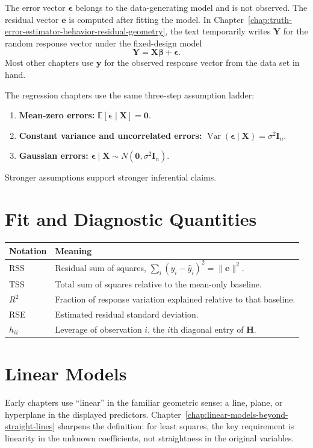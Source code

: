 {The error vector $\boldsymbol{\epsilon}$ belongs to the data-generating model and is not observed.  The residual vector $\mathbf{e}$ is computed after fitting the model.  In Chapter~\ref{chap:truth-error-estimator-behavior-residual-geometry}, the text temporarily writes $\mathbf{Y}$ for the random response vector under the fixed-design model
\[
  \mathbf{Y}=\mathbf{X}\boldsymbol{\beta}+\boldsymbol{\epsilon}.
\]
Most other chapters use $\mathbf{y}$ for the observed response vector from the data set in hand.

The regression chapters use the same three-step assumption ladder:
\begin{enumerate}
  \item \textbf{Mean-zero errors:} $\mathbb{E}[\boldsymbol{\epsilon}\mid\mathbf{X}]=\mathbf{0}$.
  \item \textbf{Constant variance and uncorrelated errors:} $\operatorname{Var}(\boldsymbol{\epsilon}\mid\mathbf{X})=\sigma^2\mathbf{I}_n$.
  \item \textbf{Gaussian errors:} $\boldsymbol{\epsilon}\mid\mathbf{X}\sim N(\mathbf{0},\sigma^2\mathbf{I}_n)$.
\end{enumerate}
Stronger assumptions support stronger inferential claims.

\section*{Fit and Diagnostic Quantities}

\begin{center}
\begin{tabular}{p{}p{}}
\toprule
\textbf{Notation} & \textbf{Meaning} \\
\midrule
RSS & Residual sum of squares, $\sum_i (y_i-\widehat{y}_i)^2=\|\mathbf{e}\|^2$. \\
TSS & Total sum of squares relative to the mean-only baseline. \\
$R^2$ & Fraction of response variation explained relative to that baseline. \\
RSE & Estimated residual standard deviation. \\
$h_{ii}$ & Leverage of observation $i$, the $i$th diagonal entry of $\mathbf{H}$. \\
\bottomrule
\end{tabular}
\end{center}

\section*{Linear Models}

Early chapters use ``linear'' in the familiar geometric sense: a line, plane, or hyperplane in the displayed predictors.  Chapter~\ref{chap:linear-models-beyond-straight-lines} sharpens the definition: for least squares, the key requirement is linearity in the unknown coefficients, not straightness in the original variables.
}

